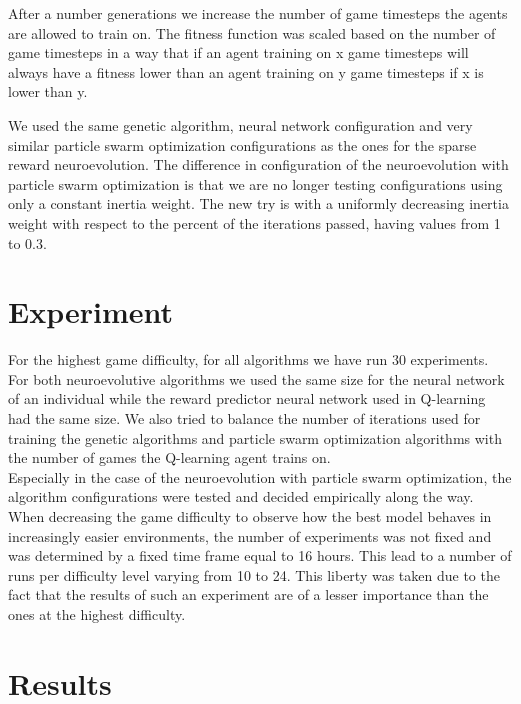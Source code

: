 \documentclass[conference]{IEEEtran}
\begin{document}
After a number generations we increase the number of game timesteps the agents are allowed to train on.
The fitness function was scaled based on the number of game timesteps in a way that if an agent
training on x game timesteps will always have a fitness lower than an agent training on y game
timesteps if x is lower than y.

We used the same genetic algorithm, neural network configuration and
very similar particle swarm optimization configurations as the ones for the sparse reward neuroevolution.
The difference in configuration of the neuroevolution with particle swarm optimization is that we are
no longer testing configurations using only a constant inertia weight.
The new try is with a uniformly decreasing inertia weight with respect to the percent of the iterations passed,
having values from 1 to 0.3.

\section{Experiment}\label{sec:experiment}
For the highest game difficulty, for all algorithms we have run 30 experiments.
For both neuroevolutive algorithms we used the same size for the neural network of an
individual while the reward predictor neural network used in Q-learning had the same size.
We also tried to balance the number of iterations used for training the genetic algorithms
and particle swarm optimization algorithms with the number of games the Q-learning agent trains on. \\

Especially in the case of the neuroevolution with particle swarm optimization, the algorithm configurations were
tested and decided empirically along the way. \\

When decreasing the game difficulty to observe how the best model behaves in increasingly easier environments,
the number of experiments was not fixed and was determined by a fixed time frame equal to 16 hours.
This lead to a number of runs per difficulty level varying from 10 to 24.
This liberty was taken due to the fact that the results of such an experiment are of a lesser importance than the ones
at the highest difficulty.

\newpage
\section{Results}\label{sec:results}
\end{document}
